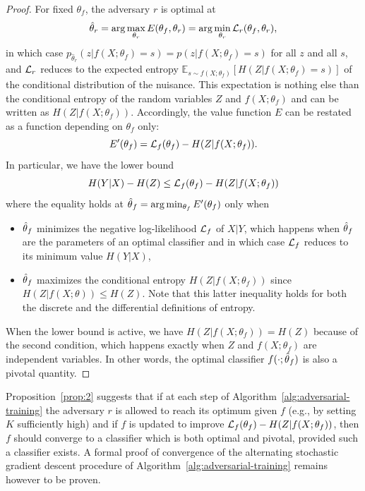 \documentclass[twocolumn,superscriptaddress,aps]{revtex4-1}
\theoremstyle{plain}
\begin{document}
\begin{proof}

For fixed $\theta_f$, the adversary $r$ is optimal at $$\hat\theta_r = \arg
\max_{\theta_r} E(\theta_f, \theta_r)  = \arg \min_{\theta_r} {\cal
L}_r(\theta_f, \theta_r),$$ in which case $p_{\hat\theta_r}(z|f(X;\theta_f)=s) =
p(z|f(X;\theta_f)=s)$ for all $z$ and all $s$, and ${\cal L}_r$ reduces to the expected entropy
$\mathbb{E}_{s \sim f(X;\theta_f)} [ H({Z|f(X;\theta_f)=s}) ]$ of the conditional distribution of the nuisance.
This expectation is nothing else than the conditional entropy of the random variables
$Z$ and $f(X;\theta_f)$ and can be written as $H(Z|f(X;\theta_f))$.
Accordingly, the
value function $E$ can be restated as a function depending on $\theta_f$ only: $$E'(\theta_f) = {\cal
L}_f(\theta_f) -  H({Z|f(X;\theta_f)}).$$  In particular, we have the lower
bound $$H({Y|X}) - H(Z) \leq {\cal L}_f(\theta_f) - H({Z|f(X;\theta_f)})$$
where the equality holds at $\smash{\hat\theta}_f = \arg \min_{\theta_f}
E'(\theta_f)$ only when
\begin{itemize}
    \item $\smash{\hat\theta}_f$ minimizes the negative log-likelihood ${\cal
    L}_f$ of $X|Y$, which happens when $\smash{\hat\theta}_f$ are the parameters
    of an optimal classifier and in which case ${\cal L}_f$ reduces to its
    minimum value $H({Y|X})$,

    \item $\smash{\hat\theta}_f$ maximizes the conditional entropy
    $H({Z|f(X;\theta_f)})$ since $H(Z|f(X;\theta)) \leq H(Z)$. Note that this
    latter inequality holds for both the discrete and the differential definitions of entropy.
\end{itemize}
When the lower bound is active, we have $H(Z|f(X;\theta_f)) = H(Z)$
because of the second condition, which happens exactly when $Z$ and $f(X;\theta_f)$
are independent variables. In other words,  the
optimal classifier $f(\cdot;\smash{\hat\theta}_f)$ is also a pivotal
quantity.

\end{proof}

Proposition~\ref{prop:2} suggests that if at each step of
Algorithm~\ref{alg:adversarial-training} the adversary $r$ is allowed to reach
its optimum given $f$ (e.g., by setting $K$ sufficiently high) and if $f$ is
updated to improve ${\cal L}_f(\theta_f) -  H({Z|f(X;\theta_f)})$, then $f$
should converge to a classifier which is both optimal and pivotal, provided such
a classifier exists. A formal proof of convergence of the alternating
stochastic gradient descent procedure of
Algorithm~\ref{alg:adversarial-training} remains however to be proven.
\end{document}
